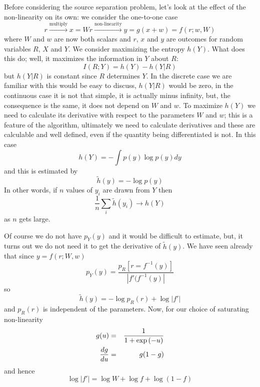 \documentclass[12pt]{article}
\begin{document}
Before considering the source separation problem, let's look at the
effect of the non-linearity on its own: we consider the one-to-one
case
\begin{equation}
r\stackrel{\mbox{multiply}}{\longrightarrow}x=Wr\stackrel{\mbox{non-linearity}}{\longrightarrow}y=g(x+w)=f(r;w,W)
\end{equation}
where $W$ and $w$ are now both scalars and $r$, $x$ and $y$ are
outcomes for random variables $R$, $X$ and $Y$. We consider maximizing
the entropy $h(Y)$. What does this do; well, it maximizes the
information in $Y$ about $R$:
\begin{equation}
I(R;Y)=h(Y)-h(Y|R)
\end{equation}
but $h(Y|R)$ is constant since $R$ determines $Y$. In the discrete
case we are familiar with this would be easy to discuss, $h(Y|R)$
would be zero, in the continuous case it is not that simple, it is
actually minus infinity, but, the consequence is the same, it does not
depend on $W$ and $w$. To maximize $h(Y)$ we need to calculate its
derivative with respect to the parameters $W$ and $w$; this is a
feature of the algorithm, ultimately we need to calculate derivatives
and these are calculable and well defined, even if the quantity being
differentiated is not. In this case
\begin{equation}
h(Y)=-\int p(y)\log{p(y)} dy
\end{equation}
and this is estimated by
\begin{equation}
\tilde{h}(y)=-\log{p(y)}
\end{equation}
In other words, if $n$ values of $y_i$ are drawn from $Y$ then 
\begin{equation}
\frac{1}{n}\sum_i\tilde{h}(y_i)\rightarrow h(Y)
\end{equation}
as $n$ gets large. 

Of course we do not have $p_Y(y)$ and it would be difficult to
estimate, but, it turns out we do not need it to get the derivative of
$\tilde{h}(y)$. We have seen already that since $y=f(r;W,w)$
\begin{equation}
p_Y(y)=\frac{p_R[r=f^{-1}(y)]}{|f'(f^{-1}(y)|}
\end{equation}
so
\begin{equation}
\tilde{h}(y)=-\log{p_R(r)}+\log{|f'|}
\end{equation}
and $p_R(r)$ is independent of the parameters. Now, for our choice of saturating non-linearity
\begin{eqnarray}
g(u)&=&\frac{1}{1+\exp{(-u)}}\cr
\frac{dg}{du}&=&g(1-g)
\end{eqnarray}
and hence
\begin{equation}
\log{|f'|}=\log{W}+\log{f}+\log{(1-f)}
\end{equation}
\end{document}

